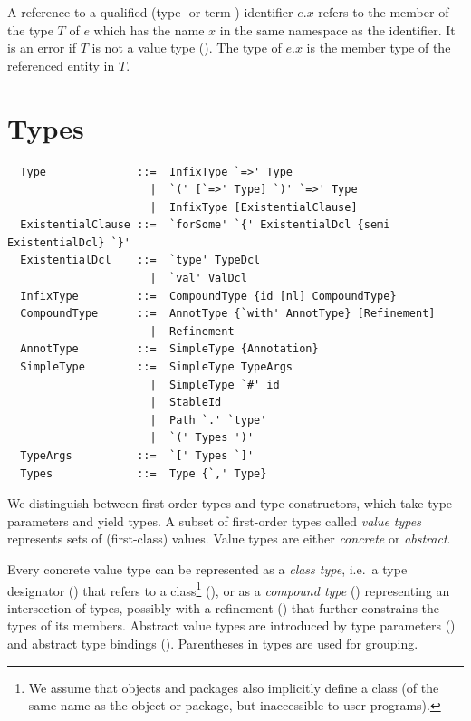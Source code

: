 A reference to a qualified (type- or term-) identifier $e.x$ refers to
the member of the type $T$ of $e$ which has the name $x$ in the same
namespace as the identifier. It is an error if $T$ is not a value type
(). The type of $e.x$ is the member type of the
referenced entity in $T$.

\chapter{\label{sec:types}Types}

\syntax\begin{lstlisting}
  Type              ::=  InfixType `=>' Type
                      |  `(' [`=>' Type] `)' `=>' Type
                      |  InfixType [ExistentialClause]
  ExistentialClause ::=  `forSome' `{' ExistentialDcl {semi ExistentialDcl} `}'
  ExistentialDcl    ::=  `type' TypeDcl 
                      |  `val' ValDcl
  InfixType         ::=  CompoundType {id [nl] CompoundType}
  CompoundType      ::=  AnnotType {`with' AnnotType} [Refinement]
                      |  Refinement
  AnnotType         ::=  SimpleType {Annotation}
  SimpleType        ::=  SimpleType TypeArgs
                      |  SimpleType `#' id
                      |  StableId
                      |  Path `.' `type'
                      |  `(' Types ')'
  TypeArgs          ::=  `[' Types `]'
  Types             ::=  Type {`,' Type}
\end{lstlisting}

We distinguish between first-order types and type constructors, which
take type parameters and yield types. A subset of first-order types
called {\em value types} represents sets of (first-class) values.
Value types are either {\em concrete} or {\em abstract}. 

Every concrete value type can be represented as a {\em class type}, i.e.\ a
type designator () that refers to a
class\footnote{We assume that objects and packages also implicitly
define a class (of the same name as the object or package, but
inaccessible to user programs).} (), or as a {\em
compound type} () representing an
intersection of types, possibly with a refinement
() that further constrains the types of its
members.
Abstract value types are introduced by type parameters () and abstract type bindings (). Parentheses in types are used for
grouping.

